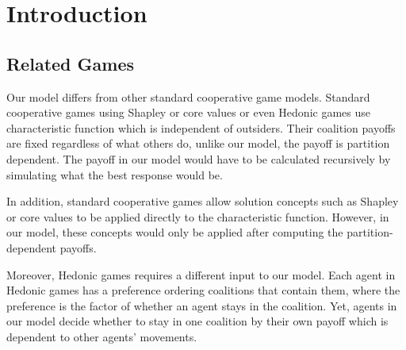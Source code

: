 \section{Introduction}


\noindent {}

\noindent {}

\subsection*{Related Games}
Our model differs from other standard cooperative game models. Standard cooperative games using Shapley or core values or even Hedonic games use characteristic function which is independent of outsiders. Their coalition payoffs are fixed regardless of what others do, unlike our model, the payoff is partition dependent. The payoff in our model would have to be calculated recursively by simulating what the best response would be. 

In addition, standard cooperative games allow solution concepts such as Shapley or core values to be applied directly to the characteristic function. However, in our model, these concepts would only be applied after computing the partition-dependent payoffs. 

Moreover, Hedonic games requires a different input to our model. Each agent in Hedonic games has a preference ordering coalitions that contain them, where the preference is the factor of whether an agent stays in the coalition. Yet, agents in our model decide whether to stay in one coalition by their own payoff which is dependent to other agents' movements.

